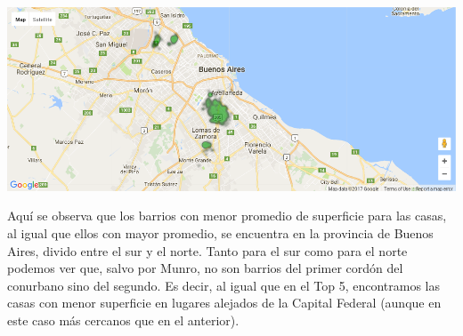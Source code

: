 \documentclass[a4paper, 10pt]{article}
\newcommand\tab[1][0.5cm]{\hspace*{#1}}
\begin{document}
				  	\begin{center}
   		    				\includegraphics[width=\textwidth]{images/houseSurfaceBottomMap}
				  	\end{center}
				  	\tab Aquí se observa que los barrios con menor promedio de superficie para las casas, al igual que ellos con
				  	mayor promedio, se encuentra en la provincia de Buenos Aires, divido entre el sur y el norte. Tanto para el
				  	sur como para el norte podemos ver que, salvo por Munro, no son barrios del primer cordón del conurbano sino
				  	del segundo. Es decir, al igual que en el Top 5, encontramos las casas con menor superficie en lugares alejados
				  	de la Capital Federal (aunque en este caso más cercanos que en el anterior).
\end{document}
